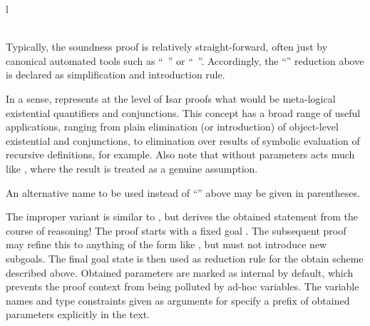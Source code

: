 \begin{isabellebody}
\begin{isamarkuptext}
\begin{matharray}{l}
    \quad \hyperlink{command.qed}{\mbox{}} \\
    \quad \hyperlink{command.fix}{\mbox{}}~~\hyperlink{command.assume}{\mbox{}} \\
  \end{matharray}

  Typically, the soundness proof is relatively straight-forward, often
  just by canonical automated tools such as ``\hyperlink{command.by}{\mbox{}}~'' or ``\hyperlink{command.by}{\mbox{}}~''.  Accordingly, the
  ``'' reduction above is declared as simplification and
  introduction rule.

  In a sense, \hyperlink{command.obtain}{\mbox{}} represents at the level of Isar
  proofs what would be meta-logical existential quantifiers and
  conjunctions.  This concept has a broad range of useful
  applications, ranging from plain elimination (or introduction) of
  object-level existential and conjunctions, to elimination over
  results of symbolic evaluation of recursive definitions, for
  example.  Also note that \hyperlink{command.obtain}{\mbox{}} without parameters acts
  much like \hyperlink{command.have}{\mbox{}}, where the result is treated as a
  genuine assumption.

  An alternative name to be used instead of ``'' above may
  be given in parentheses.

  \medskip The improper variant \hyperlink{command.guess}{\mbox{}} is similar to
  \hyperlink{command.obtain}{\mbox{}}, but derives the obtained statement from the
  course of reasoning!  The proof starts with a fixed goal .  The subsequent proof may refine this to anything of the
  form like , but must not introduce new subgoals.  The
  final goal state is then used as reduction rule for the obtain
  scheme described above.  Obtained parameters  are marked as internal by default, which prevents the
  proof context from being polluted by ad-hoc variables.  The variable
  names and type constraints given as arguments for \hyperlink{command.guess}{\mbox{}}
  specify a prefix of obtained parameters explicitly in the text.


\end{isamarkuptext}
\end{isabellebody}
